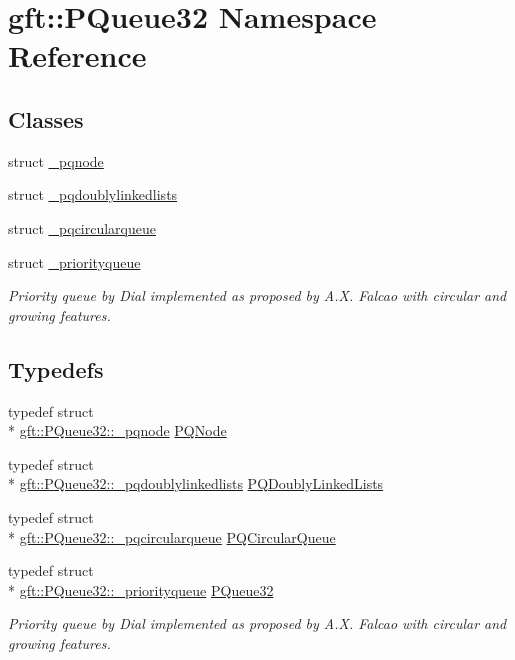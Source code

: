 \hypertarget{namespacegft_1_1PQueue32}{\section{gft\-:\-:P\-Queue32 Namespace Reference}
\label{namespacegft_1_1PQueue32}
}
\subsection*{Classes}
\begin{DoxyCompactItemize}
\item 
struct \hyperlink{structgft_1_1PQueue32_1_1__pqnode}{\-\_\-pqnode}
\item 
struct \hyperlink{structgft_1_1PQueue32_1_1__pqdoublylinkedlists}{\-\_\-pqdoublylinkedlists}
\item 
struct \hyperlink{structgft_1_1PQueue32_1_1__pqcircularqueue}{\-\_\-pqcircularqueue}
\item 
struct \hyperlink{structgft_1_1PQueue32_1_1__priorityqueue}{\-\_\-priorityqueue}
\begin{DoxyCompactList}\small\item\em Priority queue by Dial implemented as proposed by A.\-X. Falcao with circular and growing features. \end{DoxyCompactList}\end{DoxyCompactItemize}
\subsection*{Typedefs}
\begin{DoxyCompactItemize}
\item 
typedef struct \\*
\hyperlink{structgft_1_1PQueue32_1_1__pqnode}{gft\-::\-P\-Queue32\-::\-\_\-pqnode} \hyperlink{namespacegft_1_1PQueue32_ae52de18ce37cbf998885ae2ea5843494}{P\-Q\-Node}
\item 
typedef struct \\*
\hyperlink{structgft_1_1PQueue32_1_1__pqdoublylinkedlists}{gft\-::\-P\-Queue32\-::\-\_\-pqdoublylinkedlists} \hyperlink{namespacegft_1_1PQueue32_a0f1b06428dba7567e75fedd80ecadc05}{P\-Q\-Doubly\-Linked\-Lists}
\item 
typedef struct \\*
\hyperlink{structgft_1_1PQueue32_1_1__pqcircularqueue}{gft\-::\-P\-Queue32\-::\-\_\-pqcircularqueue} \hyperlink{namespacegft_1_1PQueue32_aefaf7157b45d644a8eed22d16d5ae865}{P\-Q\-Circular\-Queue}
\item 
typedef struct \\*
\hyperlink{structgft_1_1PQueue32_1_1__priorityqueue}{gft\-::\-P\-Queue32\-::\-\_\-priorityqueue} \hyperlink{namespacegft_1_1PQueue32_a27686e3155a7097ff40a4e88958bb50e}{P\-Queue32}
\begin{DoxyCompactList}\small\item\em Priority queue by Dial implemented as proposed by A.\-X. Falcao with circular and growing features. \end{DoxyCompactList}\end{DoxyCompactItemize}
